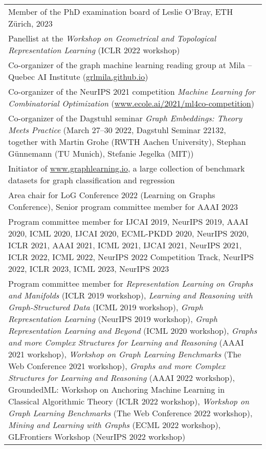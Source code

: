 \documentclass[10pt, a4paper, DIV=14, headings=small]{scrartcl}
\begin{document}
\begin{tabular}{p{14.5cm}}
	Member of the PhD examination board of Leslie O'Bray, ETH Zürich, 2023 \\[.2em]
	
	Panellist at the \emph{Workshop on Geometrical and Topological Representation Learning} (ICLR 2022 workshop) \\[0.2em]

	Co-organizer of the graph machine learning reading group at Mila -- Quebec AI Institute (\url{grlmila.github.io}) \\[1.5em]

	Co-organizer of the NeurIPS 2021 competition \emph{Machine Learning for Combinatorial Optimization} (\url{www.ecole.ai/2021/ml4co-competition}) \\[1.5em]

	Co-organizer of the Dagstuhl seminar \emph{Graph Embeddings: Theory Meets Practice} (March 27–30 2022, Dagstuhl Seminar 22132, together with Martin Grohe (RWTH Aachen University), Stephan Günnemann (TU Munich), Stefanie Jegelka (MIT)) \\[1.5em]

	Initiator of \url{www.graphlearning.io}, a large collection of benchmark datasets for graph classification and regression \\[1.5em]

	Area chair for LoG Conference 2022 (Learning on Graphs Conference), Senior program committee member for AAAI 2023 \\[1.5em]

	Program committee member for IJCAI 2019, NeurIPS  2019, AAAI 2020, ICML 2020, IJCAI 2020, ECML-PKDD 2020, NeurIPS 2020, ICLR 2021, AAAI 2021, ICML 2021, IJCAI 2021, NeurIPS 2021, ICLR 2022, ICML 2022, NeurIPS 2022 Competition Track, NeurIPS 2022, ICLR 2023, ICML 2023, NeurIPS 2023 \\[2.5em]

	Program committee member for \emph{Representation Learning on Graphs and Manifolds} (ICLR 2019 workshop), \emph{Learning and Reasoning with Graph-Structured Data} (ICML 2019 workshop), \emph{Graph Representation Learning} (NeurIPS 2019 workshop), \emph{Graph Representation Learning and Beyond} (ICML 2020 workshop), \emph{Graphs and more Complex Structures for Learning and Reasoning} (AAAI 2021 workshop), \emph{Workshop on Graph Learning Benchmarks} (The Web Conference 2021 workshop),  \emph{Graphs and more Complex Structures for Learning and Reasoning} (AAAI 2022 workshop), GroundedML: Workshop on Anchoring Machine Learning in Classical Algorithmic Theory (ICLR 2022 workshop), \emph{Workshop on Graph Learning Benchmarks} (The Web Conference 2022 workshop), \emph{Mining and Learning with Graphs} (ECML 2022 workshop), GLFrontiers Workshop (NeurIPS 2022 workshop) \\[2.5em]


\end{tabular}
\end{document}

